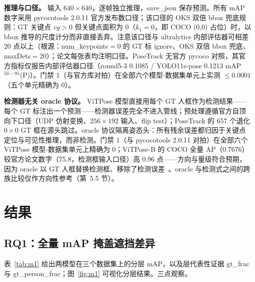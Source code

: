 \documentclass[10pt,conference]{IEEEtran}
\begin{document}
\textbf{推理与口径。} 输入 $640\times640$，逐帧独立推理，save\_json 保存预测。所有 mAP 数字采用 pycocotools 2.0.11 官方发布数口径；该口径的 OKS 双倍 bbox 兜底规则：GT 关键点 $vg>0$ 但关键点面积为 0（$k_1=0$，即 COCO (0,0) 占位）时，以 bbox 推导的尺度计分而非直接丢弃。注意该口径与 ultralytics 内部评估器可相差 20 点以上（根源：num\_keypoints$=$0 的 GT 标 ignore、OKS 双倍 bbox 兜底、maxDets$=$20）；论文每张表均注明口径。PoseTrack 无官方 pycoco 对照，其官方指标仅报告内部评估器口径（round5-3 0.1085 / YOLO11s-pose 0.1213 mAP$^{50-95}$(P)）。门禁 1（与官方库对拍）在全部六个模型-数据集单元上实测 $\le 0.0001$（五个单元精确为 0）。

\textbf{检测器无关 oracle 协议。} ViTPose 模型直接用每个 GT 人框作为检测结果——每个 GT 标注出一个预测——检测器误差完全不进入管线；预处理遵循官方自顶向下口径（UDP 仿射变换、$256\times192$ 输入、flip test）；PoseTrack 的 657 个退化 $0\times0$ GT 框在源头跳过。oracle 协议隔离姿态头：所有残余误差都归因于关键点定位与可见性推理，而非检测。门禁 1（与 pycocotools 2.0.11 对拍）在全部六个 ViTPose 模型-数据集单元上精确为 0；ViTPose-B 的 COCO 全量 AP（0.7676）较官方论文数字（75.8，检测框输入口径）高 0.96 点——方向与量级符合预期，因为 oracle 以 GT 人框替换检测框、移除了检测误差~\cite{17}。oracle 与检测式之间的跨族比较仅作方向性参考（第~5.5 节）。

\section{结果}

\subsection{RQ1：全量 mAP 掩盖遮挡差异}

表~\ref{tab:m1} 给出两模型在三个数据集上的分层 mAP，以及层代表性证据 gt\_frac 与 gt\_person\_frac；图~\ref{fig:m1} 可视化分层结果。三点观察。
\end{document}

